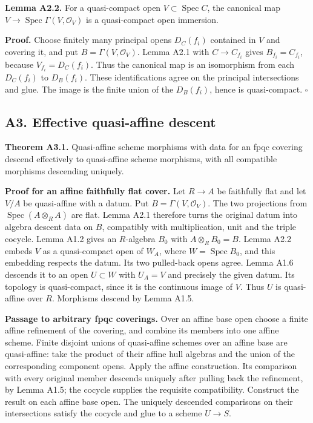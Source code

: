 \documentclass[11pt,a4paper,openany]{report}
\begin{document}
\textbf{Lemma A2.2.} For a quasi-compact open \(V\subset\operatorname{Spec}C\), the canonical map \(V\to\operatorname{Spec}\Gamma(V,\mathcal O_V)\) is a quasi-compact open immersion.

\textbf{Proof.} Choose finitely many principal opens \(D_C(f_i)\) contained in \(V\) and covering it, and put \(B=\Gamma(V,\mathcal O_V)\). Lemma A2.1 with \(C\to C_{f_i}\) gives \(B_{f_i}=C_{f_i}\), because \(V_{f_i}=D_C(f_i)\). Thus the canonical map is an isomorphism from each \(D_C(f_i)\) to \(D_B(f_i)\). These identifications agree on the principal intersections and glue. The image is the finite union of the \(D_B(f_i)\), hence is quasi-compact. \(\square\)

\subsection{A3. Effective quasi-affine descent}\label{AG-RG-S04-a3.-effective-quasi-affine-descent}

\textbf{Theorem A3.1.} Quasi-affine scheme morphisms with data for an fpqc covering descend effectively to quasi-affine scheme morphisms, with all compatible morphisms descending uniquely.

\textbf{Proof for an affine faithfully flat cover.} Let \(R\to A\) be faithfully flat and let \(V/A\) be quasi-affine with a datum. Put \(B=\Gamma(V,\mathcal O_V)\). The two projections from \(\operatorname{Spec}(A\otimes_R A)\) are flat. Lemma A2.1 therefore turns the original datum into algebra descent data on \(B\), compatibly with multiplication, unit and the triple cocycle. Lemma A1.2 gives an \(R\)-algebra \(B_0\) with \(A\otimes_R B_0=B\). Lemma A2.2 embeds \(V\) as a quasi-compact open of \(W_A\), where \(W=\operatorname{Spec}B_0\), and this embedding respects the datum. Its two pulled-back opens agree. Lemma A1.6 descends it to an open \(U\subset W\) with \(U_A=V\) and precisely the given datum. Its topology is quasi-compact, since it is the continuous image of \(V\). Thus \(U\) is quasi-affine over \(R\). Morphisms descend by Lemma A1.5.

\textbf{Passage to arbitrary fpqc coverings.} Over an affine base open choose a finite affine refinement of the covering, and combine its members into one affine scheme. Finite disjoint unions of quasi-affine schemes over an affine base are quasi-affine: take the product of their affine hull algebras and the union of the corresponding component opens. Apply the affine construction. Its comparison with every original member descends uniquely after pulling back the refinement, by Lemma A1.5; the cocycle supplies the requisite compatibility. Construct the result on each affine base open. The uniquely descended comparisons on their intersections satisfy the cocycle and glue to a scheme \(U\to S\).
\end{document}
